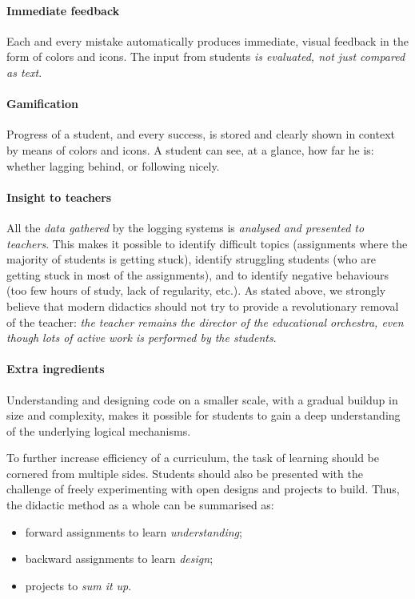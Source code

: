 \paragraph{Immediate feedback}
Each and every mistake automatically produces immediate, visual feedback in the form of colors and icons. The input from students \textit{is evaluated, not just compared as text}.

\paragraph{Gamification}
Progress of a student, and every success, is stored and clearly shown in context by means of colors and icons. A student can see, at a glance, how far he is: whether lagging behind, or following nicely.

\paragraph{Insight to teachers}
All the \textit{data gathered} by the logging systems is \textit{analysed and presented to teachers}. This makes it possible to identify difficult topics (assignments where the majority of students is getting stuck), identify struggling students (who are getting stuck in most of the assignments), and to identify negative behaviours (too few hours of study, lack of regularity, etc.). As stated above, we strongly believe that modern didactics should not try to provide a revolutionary removal of the teacher: \textit{the teacher remains the director of the educational orchestra, even though lots of active work is performed by the students}.

\paragraph{Extra ingredients}
Understanding and designing code on a smaller scale, with a gradual buildup in size and complexity, makes it possible for students to gain a deep understanding of the underlying logical mechanisms.

To further increase efficiency of a curriculum, the task of learning should be cornered from multiple sides. Students should also be presented with the challenge of freely experimenting with open designs and projects to build. Thus, the didactic method as a whole can be summarised as:

\begin{itemize}[noitemsep]
	\item forward assignments to learn \textit{understanding};
	\item backward assignments to learn \textit{design};
	\item projects to \textit{sum it up}.
\end{itemize}

